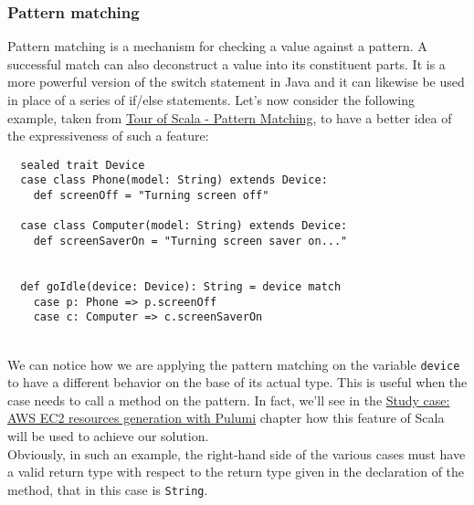 \subsubsection{Pattern matching}
Pattern matching is a mechanism for checking a value against a pattern.
A successful match can also deconstruct a value into its constituent parts.
It is a more powerful version of the switch statement in Java and it can likewise be used in place of a series of if/else statements.
Let's now consider the following example, taken from \href{https://docs.scala-lang.org/tour/pattern-matching.html#}{Tour of Scala - Pattern Matching}, to have a better idea of the expressiveness of such a feature:
\begin{verbatim}
  sealed trait Device
  case class Phone(model: String) extends Device:
    def screenOff = "Turning screen off"

  case class Computer(model: String) extends Device:
    def screenSaverOn = "Turning screen saver on..."


  def goIdle(device: Device): String = device match
    case p: Phone => p.screenOff
    case c: Computer => c.screenSaverOn
\end{verbatim}\mbox{}\\
We can notice how we are applying the pattern matching on the variable \texttt{device} to have a different behavior on the base of its actual type.
This is useful when the case needs to call a method on the pattern.
In fact, we'll see in the \hyperref[cap:case-study]{Study case: AWS EC2 resources generation with Pulumi} chapter how this feature of Scala will be used to achieve our solution.\\
Obviously, in such an example, the right-hand side of the various cases must have a valid return type with respect to the return type given in the declaration of the method, that in this case is \texttt{String}.

